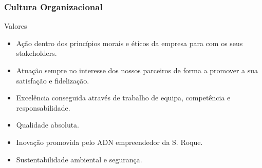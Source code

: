 \begin{frame}
\frametitle{Cultura Organizacional}
\begin{exampleblock}{Valores}
\begin{itemize}
\setlength\itemsep{-0.3em}
\item Ação dentro dos princípios morais e éticos da empresa para com os seus stakeholders.
\item Atuação sempre no interesse dos nossos parceiros de forma a promover a sua satisfação e fidelização.
\item Excelência conseguida através de trabalho de equipa, competência e responsabilidade.
\item Qualidade absoluta.
\item Inovação promovida pelo ADN empreendedor da S. Roque.
\item Sustentabilidade ambiental e segurança.
\end{itemize}
\end{exampleblock}
\end{frame}
